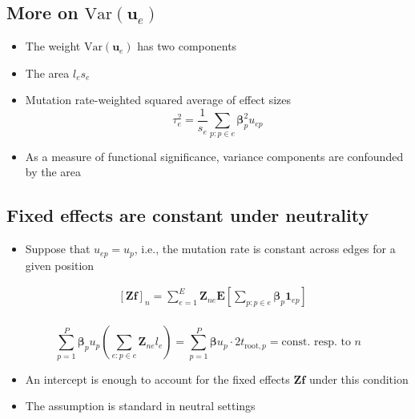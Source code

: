 \documentclass[
  letterpaper,
  DIV=11,
  numbers=noendperiod]{scrartcl}
\providecommand{\tightlist}{%
  \setlength{\itemsep}{0pt}\setlength{\parskip}{0pt}}\usepackage{longtable,booktabs,array}
\begin{document}
\subsection{\texorpdfstring{More on
\(\mathrm{Var}(\mathbf{u}_e)\)}{More on \textbackslash mathrm\{Var\}(\textbackslash mathbf\{u\}\_e)}}\label{more-on-mathrmvarmathbfu_e}

\begin{itemize}
\tightlist
\item
  The weight \(\mathrm{Var}(\mathbf{u}_e)\) has two components
\item
  The area \(l_e s_e\)
\item
  Mutation rate-weighted squared average of effect sizes \[
        \tau_e^2 = \frac{1}{s_e} \sum_{p:p \in e} \boldsymbol{\beta}_p^2 u_{ep}
    \]
\item
  As a measure of functional significance, variance components are
  confounded by the area
\end{itemize}

\subsection{Fixed effects are constant under
neutrality}\label{fixed-effects-are-constant-under-neutrality}

\begin{itemize}
\tightlist
\item
  Suppose that \(u_{ep}=u_p\), i.e., the mutation rate is constant
  across edges for a given position
\end{itemize}

\[
\begin{aligned}
    &\left[ \mathbf{Z} \mathbf{f} \right]_n = \sum_{e=1}^E \mathbf{Z}_{ne} \mathbf{E}
    \left[ \sum_{p: p \in e} \boldsymbol{\beta}_p\mathbf{1}_{ep} \right] \\
    \end{aligned}
\]

\[
\sum_{p=1}^P \boldsymbol{\beta}_p u_p 
    \left(
            \sum_{e: p \in e} \mathbf{Z}_{ne} l_e
    \right)
    = \sum_{p=1}^P \boldsymbol{\beta}u_p \cdot 2t_{\mathrm{root},p} = \text{const. resp. to $n$}
\]

\begin{itemize}
\item
  An intercept is enough to account for the fixed effects
  \(\mathbf{Z}\mathbf{f}\) under this condition
\item
  The assumption is standard in neutral settings
\end{itemize}
\end{document}
